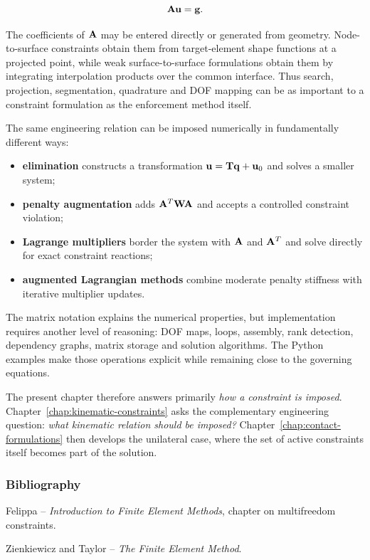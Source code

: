 \begin{equation}
    \mathbf{A}\mathbf{u}=\mathbf{g}.
\end{equation}

The coefficients of $\mathbf{A}$ may be entered directly or generated from geometry.
Node-to-surface constraints obtain them from target-element shape functions at a
projected point, while weak surface-to-surface formulations obtain them by
integrating interpolation products over the common interface. Thus search,
projection, segmentation, quadrature and DOF mapping can be as important to a
constraint formulation as the enforcement method itself.

The same engineering relation can be imposed numerically in fundamentally
different ways:

\begin{itemize}
    \item \textbf{elimination} constructs a transformation
    $\mathbf{u}=\mathbf{T}\mathbf{q}+\mathbf{u}_0$ and solves a smaller system;
    \item \textbf{penalty augmentation} adds
    $\mathbf{A}^T\mathbf{W}\mathbf{A}$ and accepts a controlled constraint violation;
    \item \textbf{Lagrange multipliers} border the system with
    $\mathbf{A}$ and $\mathbf{A}^T$ and solve directly for exact constraint reactions;
    \item \textbf{augmented Lagrangian methods} combine moderate penalty
    stiffness with iterative multiplier updates.
\end{itemize}

The matrix notation explains the numerical properties, but implementation
requires another level of reasoning: DOF maps, loops, assembly, rank detection,
dependency graphs, matrix storage and solution algorithms. The Python examples
make those operations explicit while remaining close to the governing equations.

The present chapter therefore answers primarily \textit{how a constraint is
imposed}. Chapter~\ref{chap:kinematic-constraints} asks the complementary
engineering question: \textit{what kinematic relation should be imposed?}
Chapter~\ref{chap:contact-formulations} then develops the unilateral case, where
the set of active constraints itself becomes part of the solution.

\subsubsection{Bibliography}

Felippa -- \textit{Introduction to Finite Element Methods}, chapter on
multifreedom constraints.

Zienkiewicz and Taylor -- \textit{The Finite Element Method}.
